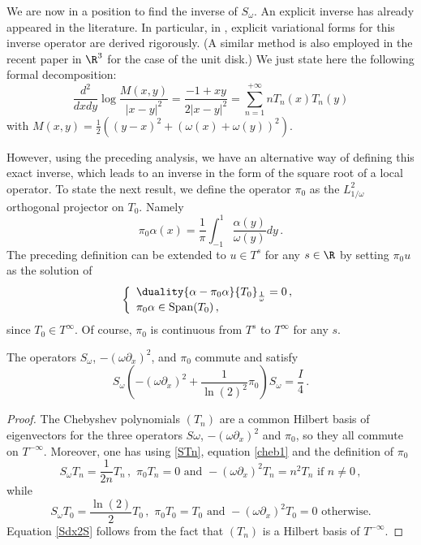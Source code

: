 \documentclass[a4paper]{article}
\begin{document}
	
	We are now in a position to find the inverse of $S_\omega$. An explicit inverse has already appeared in the literature. In 
	particular, in \cite{jerez2011variational,urzua2014optimal}, explicit variational forms for this inverse operator are derived rigorously. (A similar method is also employed in the recent paper \cite{hiptmair2017closed} in $\R^3$ for the case of the unit disk.) We just state here the following formal decomposition:
	\[\dfrac{d^2}{dxdy}\log\frac{M(x,y)}{|x-y|^2} = \frac{-1+xy}{2|x-y|^2} = \sum_{n=1}^{+ \infty} n T_n(x)T_n(y)\]
	with 
	$M(x,y) = \frac{1}{2}\left((y-x)^2 + (\omega(x) + \omega(y))^2\right) $.
	
	However, using the preceding analysis, we have an alternative way of defining this exact inverse, which leads to an  inverse in the form of the square root of a local operator. To state the next result, we define the operator $\pi_{0}$ as the $L^2_{1/\omega}$ 
	orthogonal projector on $T_0$. Namely 
	\[\pi_0 \alpha(x)  = \frac{1}{\pi} \int_{-1}^{1}\frac{\alpha(y)}{\omega(y)}dy\,.\]
	The preceding definition can be extended to $u \in T^s$ for any $s \in \R$ by setting $\pi_0 u$ as the solution of
	\[\left\{
	\begin{array}{l}\duality{\alpha-\pi_0 \alpha}{T_0}_{\frac{1}{\omega}} = 0\,,\\
	\pi_0\alpha\in \mbox{Span}(T_0)\,,
	\end{array}
	\right.\]
	since $T_0\in T^\infty$. Of course, $\pi_0$ is continuous from $T^s$ to $T^{\infty}$ for any $s$. 
	
	\begin{The}
		\label{TheSdx2S}
		The operators $S_\omega$, $-(\omega\partial_x)^2$, and $\pi_0$ commute and satisfy
		\begin{equation}
		S_{\omega}\left(-(\omega\partial_x)^2 + \frac{1}{\ln(2)^2} \pi_0 \right)S_{\omega} = \frac{I}{4}\,.
		\label{Sdx2S}
		\end{equation}
	\end{The}
	\begin{proof}
		The Chebyshev polynomials $(T_n)$ are a common Hilbert basis of eigenvectors for the three operators $S\omega$, $-(\omega \partial_x)^2$ and $\pi_0$, so they all commute on $T^{-\infty}$. 
		Moreover, one has using \autoref{STn}, equation \eqref{cheb1} and the definition of $\pi_0$
		\[ S_\omega T_n =\frac{1}{2n}T_n\,,\,\, \pi_0 T_n = 0 \mbox{ and } -(\omega\partial_x)^2T_n = n^2 T_n \mbox{ if } n\ne 0\,,\]
		while
		\[ S_\omega T_0 = \frac{\ln(2)}{2} T_0\,,\,\, \pi_0 T_0 = T_0 \mbox{ and } -(\omega\partial_x)^2T_0 = 0 \mbox{ otherwise.}\]
		Equation \eqref{Sdx2S} follows from the fact that $(T_n)$ is a Hilbert basis of $T^{-\infty}$.
	\end{proof}
	
\end{document}

